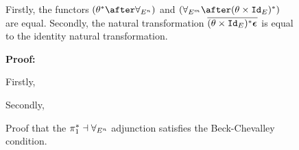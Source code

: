 \begin{figure}
    \begin{framed}
        
\begin{theorem}
    Firstly, the functors $(\theta\star\after\allEn)$ and $(\allEm\after(\theta\times\Id{E})\star)$ are equal. Secondly, the natural transformation $\overline{(\theta\times\texttt{Id}_{E})^* \boldsymbol{\epsilon}_{}}$ is equal to the identity natural transformation.
\end{theorem}

  \textbf{Proof:}
  \\
        \begin{minipage}[t]{0.45\linewidth}
            Firstly,

            
        \end{minipage}\quad
        \begin{minipage}[t]{0.45\linewidth}      
        Secondly,

    \end{minipage}

    \end{framed}
    \caption{Proof that the $\pi_1^* \dashv \forall_{E^n}$ adjunction satisfies the Beck-Chevalley condition.}
    \label{BeckChevalley1}
\end{figure}

